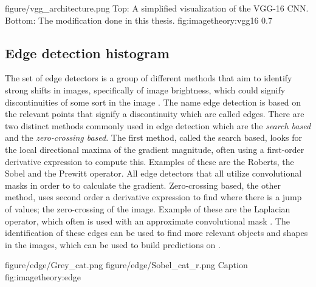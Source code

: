 \singlefigurenear
{figure/vgg_architecture.png}
{Top: A simplified visualization of the VGG-16 CNN. Bottom: The modification done in this thesis.}
{fig:imagetheory:vgg16}
{0.7}

\subsection{Edge detection histogram}
\label{sec:sob_feature}
The set of edge detectors is a group of different methods that aim to identify strong shifts in images, specifically of image brightness, which could signify discontinuities of some sort in the image \cite{canny1986computational}. The name edge detection is based on the relevant points that signify a discontinuity which are called edges. There are two distinct methods commonly used in edge detection which are the \emph{search based} and the \emph{zero-crossing based}. The first method, called the search based, looks for the local directional maxima of the gradient magnitude, often using a first-order derivative expression to compute this. Examples of these are the Roberts, the Sobel  and the Prewitt operator. All edge detectors that all utilize convolutional masks in order to to calculate the gradient. Zero-crossing based, the other method, uses second order a derivative expression to find where there is a jump of values; the zero-crossing of the image. Example of these are the Laplacian operator, which often is used with an approximate convolutional mask \cite{jain1995machine}. The identification of these edges can be used to find more relevant objects and shapes in the images, which can be used to build predictions on \cite{maini2009study}. 

\twofigure
{figure/edge/Grey_cat.png}
{figure/edge/Sobel_cat_r.png}
{Caption}
{fig:imagetheory:edge} 
